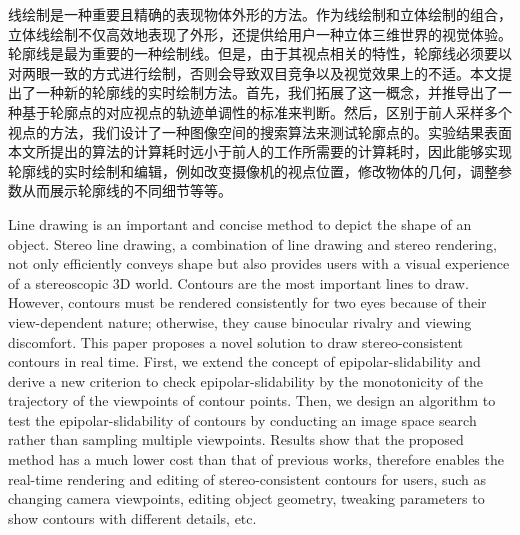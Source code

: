 \cleardoublepage
{}
线绘制是一种重要且精确的表现物体外形的方法。作为线绘制和立体绘制的组合，立体线绘制不仅高效地表现了外形，还提供给用户一种立体三维世界的视觉体验。轮廓线是最为重要的一种绘制线。但是，由于其视点相关的特性，轮廓线必须要以对两眼一致的方式进行绘制，否则会导致双目竞争以及视觉效果上的不适。本文提出了一种新的\stc{}轮廓线的实时绘制方法。首先，我们拓展了\epsl{}这一概念，并推导出了一种基于轮廓点的对应视点的轨迹单调性的标准来判断\epsl{}。然后，区别于前人采样多个视点的方法，我们设计了一种图像空间的搜索算法来测试轮廓点的\epsl{}。实验结果表面本文所提出的算法的计算耗时远小于前人的工作所需要的计算耗时，因此能够实现\stc{}轮廓线的实时绘制和编辑，例如改变摄像机的视点位置，修改物体的几何，调整参数从而展示轮廓线的不同细节等等。


\cleardoublepage
{}
Line drawing is an important and concise method to depict the shape of an object. Stereo line drawing, a combination of line drawing and stereo rendering, not only efficiently conveys shape but also provides users with a visual experience of a stereoscopic 3D world. Contours are the most important lines to draw. However, contours must be rendered consistently for two eyes because of their view-dependent nature; otherwise, they cause binocular rivalry and viewing discomfort. This paper proposes a novel solution to draw stereo-consistent contours in real time. First, we extend the concept of epipolar-slidability and derive a new criterion to check epipolar-slidability by the monotonicity of the trajectory of the viewpoints of contour points. Then, we design an algorithm to test the epipolar-slidability of contours by conducting an image space search rather than sampling multiple viewpoints. Results show that the proposed method has a much lower cost than that of previous works, therefore enables the real-time rendering and editing of stereo-consistent contours for users, such as changing camera viewpoints, editing object geometry, tweaking parameters to show contours with different details, etc.